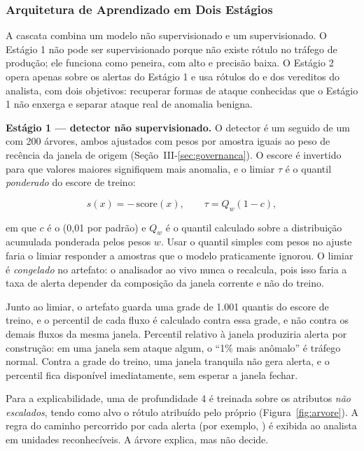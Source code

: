 \subsubsection{Arquitetura de Aprendizado em Dois Estágios}
\label{sec:estagios}

A cascata combina um modelo não supervisionado e um supervisionado. O Estágio 1 não
pode ser supervisionado porque não existe rótulo no tráfego de produção; ele
funciona como peneira, com  alto e precisão baixa. O Estágio 2 opera
apenas sobre os alertas do Estágio 1 e usa rótulos do  e dos
vereditos do analista, com dois objetivos: recuperar formas de ataque conhecidas
que o Estágio 1 não enxerga e separar ataque real de anomalia benigna.

\textbf{Estágio 1 --- detector não supervisionado.} O detector é um
 seguido de um  com 200 árvores, ambos
ajustados com pesos por amostra iguais ao peso de recência da janela de origem
(Seção~III-\ref{sec:governanca}). O escore é invertido para que valores maiores
signifiquem mais anomalia, e o limiar $\tau$ é o quantil \emph{ponderado} do escore
de treino:

\begin{equation}
  s(x) = -\,\mathrm{score}(x), \qquad
  \tau = Q_w\!\left(1 - c\right),
  \label{eq:limiar}
\end{equation}

\noindent em que $c$ é o  (0,01 por padrão) e $Q_w$ é o quantil
calculado sobre a distribuição acumulada ponderada pelos pesos $w$. Usar o quantil
simples com pesos no ajuste faria o limiar responder a amostras que o modelo
praticamente ignorou. O limiar é \emph{congelado} no artefato: o analisador ao vivo
nunca o recalcula, pois isso faria a taxa de alerta depender da composição da
janela corrente e não do treino.

Junto ao limiar, o artefato guarda uma grade de 1.001 quantis do escore de treino,
e o percentil de cada fluxo é calculado contra essa grade, e não contra os demais
fluxos da mesma janela. Percentil relativo à janela produziria alerta por
construção: em uma janela sem ataque algum, o “1\% mais anômalo” é tráfego normal.
Contra a grade do treino, uma janela tranquila não gera alerta, e o percentil fica
disponível imediatamente, sem esperar a janela fechar.

Para a explicabilidade, uma  de profundidade 4 é
treinada sobre os atributos \emph{não escalados}, tendo como alvo o rótulo atribuído
pelo próprio  (Figura~\ref{fig:arvore}). A regra do caminho
percorrido por cada alerta (por exemplo, )
é exibida ao analista em unidades reconhecíveis. A árvore explica, mas não decide.

